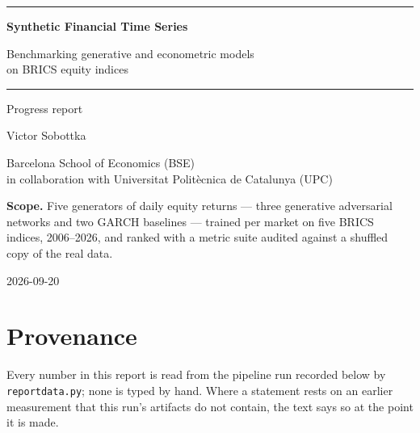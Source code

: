 \documentclass[11pt,a4paper]{article}
\makeatletter
\DeclareRobustCommand{\_}{\ifmmode\nfss@text{\textunderscore}\else\textunderscore\allowbreak\fi}
\makeatother
\begin{document}
\begin{titlepage}
\thispagestyle{empty}
\setlength{\parindent}{0pt}

\vspace*{3.2cm}
{\sffamily\color{Accent}\rule{\linewidth}{0.8pt}\par\vspace{0.9cm}
{\fontsize{30}{36}\selectfont\bfseries Synthetic Financial Time Series\par}
\vspace{0.5cm}
{\LARGE Benchmarking generative and econometric models\\[2pt] on BRICS equity indices\par}
\vspace{0.9cm}\rule{\linewidth}{0.8pt}\par}
\vspace{0.9cm}
{\sffamily\Large Progress report\par}
\vspace{2.6cm}
{\large Victor Sobottka\par}
\vspace{0.3cm}
{\normalsize Barcelona School of Economics (BSE)\\ in collaboration with Universitat Polit\`ecnica de Catalunya (UPC)\par}
\vfill
{\sffamily\small\textbf{Scope.} Five generators of daily equity returns --- three generative adversarial networks and two GARCH baselines --- trained per market on five BRICS indices, 2006--2026, and ranked with a metric suite audited against a shuffled copy of the real data.\par}
\vspace{0.7cm}
{\sffamily\small 2026-09-20\par}
\end{titlepage}
\setcounter{page}{2}

\tableofcontents
\clearpage

\section*{Provenance}
\label{sec:provenance}
Every number in this report is read from the pipeline run recorded below by \texttt{report\_data.py}; none is typed by hand. Where a statement rests on an earlier measurement that this run's artifacts do not contain, the text says so at the point it is made.
\end{document}
